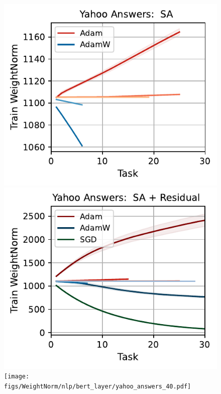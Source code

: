 \begin{figure}[htb!]
{    \includegraphics[width=\textwidth]{figs/WeightNorm/nlp/attention/yahoo_answers_40.pdf}
    \includegraphics[width=\textwidth]{figs/WeightNorm/nlp/attention_residual/yahoo_answers_40.pdf}
    \texttt{[image: figs/WeightNorm/nlp/bert\_layer/yahoo\_answers\_40.pdf]}
    }\\    \resizebox{\textwidth}{!}{  
}
\end{figure}
